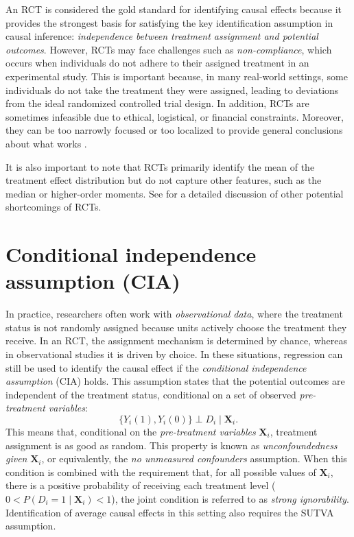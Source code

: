 An RCT is considered the gold standard for identifying causal effects because it provides the strongest basis for satisfying the key identification assumption in causal inference: \textit{independence between treatment assignment and potential outcomes}. However, RCTs may face challenges such as \textit{non-compliance}, which occurs when individuals do not adhere to their assigned treatment in an experimental study. This is important because, in many real-world settings, some individuals do not take the treatment they were assigned, leading to deviations from the ideal randomized controlled trial design. In addition, RCTs are sometimes infeasible due to ethical, logistical, or financial constraints. Moreover, they can be too narrowly focused or too localized to provide general conclusions about what works \cite{deaton2010instruments}.

It is also important to note that RCTs primarily identify the mean of the treatment effect distribution but do not capture other features, such as the median or higher-order moments. See \cite{deaton2010instruments} for a detailed discussion of other potential shortcomings of RCTs.

\section{Conditional independence assumption (CIA)}

In practice, researchers often work with \textit{observational data}, where the treatment status is not randomly assigned because units actively choose the treatment they receive. In an RCT, the assignment mechanism is determined by chance, whereas in observational studies it is driven by choice. In these situations, regression can still be used to identify the causal effect if the \textit{conditional independence assumption} (CIA) holds. This assumption states that the potential outcomes are independent of the treatment status, conditional on a set of observed  \textit{pre-treatment variables}:
\[
\{ Y_i(1), Y_i(0) \} \perp D_i \mid \mathbf{X}_i.
\]
This means that, conditional on the \textit{pre-treatment variables} $\mathbf{X}_i$, treatment assignment is as good as random. This property is known as \textit{unconfoundedness given} $\mathbf{X}_i$, or equivalently, the \textit{no unmeasured confounders} assumption. When this condition is combined with the requirement that, for all possible values of $\mathbf{X}_i$, there is a positive probability of receiving each treatment level ($0 < P(D_i = 1 \mid \mathbf{X}_i) < 1$), the joint condition is referred to as \textit{strong ignorability}. Identification of average causal effects in this setting also requires the SUTVA assumption.

